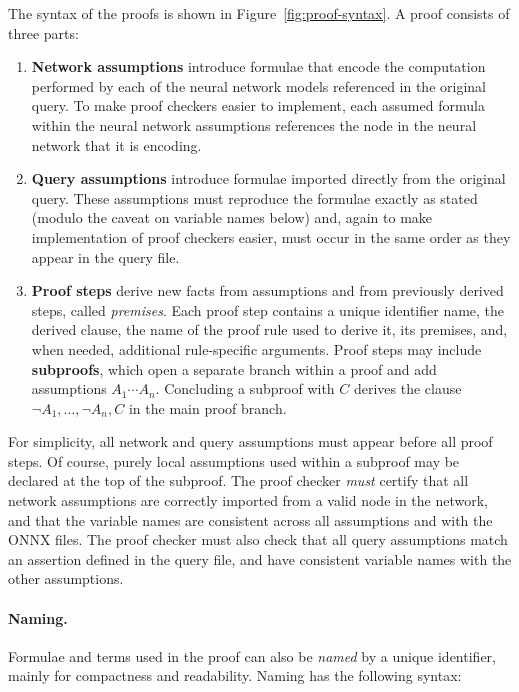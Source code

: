 The syntax of the proofs is shown in Figure~\ref{fig:proof-syntax}. A \vnnlib{} proof consists of three parts:
\begin{enumerate}
	\item \textbf{Network assumptions} introduce formulae that encode the computation performed by each of the neural network models referenced in the original query. To make proof checkers easier to implement, each assumed formula within the neural network assumptions references the node in the neural network that it is encoding.

	\item \textbf{Query assumptions} introduce formulae imported directly from the original \vnnlib{} query. These assumptions  must reproduce the formulae exactly as stated (modulo the caveat on variable names below) and, again to make implementation of proof checkers easier, must occur in the same order as they appear in the query file. 

	\item \textbf{Proof steps} derive new facts from assumptions and from previously derived steps, called \emph{premises}. Each proof step contains a unique identifier name, the derived clause, the name of the proof rule used to derive it, its premises, and, when needed, additional rule-specific arguments.
Proof steps may include \textbf{subproofs}, which open a separate branch within a proof and add assumptions $A_1 \cdots A_n$. Concluding a subproof with $C$ derives the clause $\lnot A_1, \dots, \lnot A_n, C$ in the main proof branch.
\end{enumerate}

For simplicity, all network and query assumptions must appear before all proof steps. Of course, purely local assumptions used within a subproof may be declared at the top of the subproof.
The proof checker \emph{must} certify that all network assumptions are correctly imported from a valid node in the network, and that the variable names are consistent across all assumptions and with the ONNX files. The proof checker must also check that all query assumptions match an assertion defined in the \vnnlib{} query file, and have consistent variable names with the other assumptions.
	
	
\paragraph{Naming.} Formulae and terms used in the proof can also be \emph{named} by a unique identifier, mainly for compactness and readability. Naming has the following syntax:

